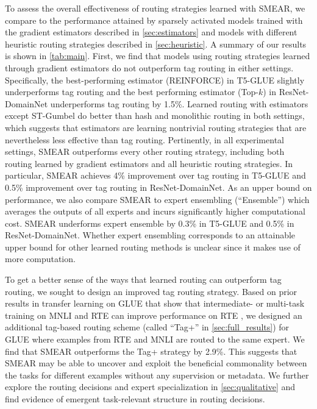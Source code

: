 \documentclass{article}
\theoremstyle{plain}
\theoremstyle{definition}
\theoremstyle{remark}
\begin{document}
To assess the overall effectiveness of routing strategies learned with SMEAR, we compare to the performance attained by sparsely activated models trained with the gradient estimators described in \cref{sec:estimators} and models with different heuristic routing strategies described in \cref{sec:heuristic}.
A summary of our results is shown in \cref{tab:main}.
First, we find that models using routing strategies learned through gradient estimators do not outperform tag routing in either settings. 
Specifically, the best-performing estimator (REINFORCE) in T5-GLUE slightly underperforms tag routing and the best performing estimator (Top-$k$) in ResNet-DomainNet underperforms tag routing by 1.5\%.
Learned routing with estimators except ST-Gumbel do better than hash and monolithic routing in both settings, which suggests that estimators are learning nontrivial routing strategies that are nevertheless less effective than tag routing. 
Pertinently, in all experimental settings, SMEAR outperforms every other routing strategy, including both routing learned by gradient estimators and all heuristic routing strategies.
In particular, SMEAR achieves 4\% improvement over tag routing in T5-GLUE and 0.5\% improvement over tag routing in ResNet-DomainNet.
As an upper bound on performance, we also compare SMEAR to expert ensembling (``Ensemble'') which averages the outputs of all experts and incurs significantly higher computational cost. 
SMEAR underforms expert ensemble by 0.3\% in T5-GLUE and 0.5\% in ResNet-DomainNet.
Whether expert ensembling corresponds to an attainable upper bound for other learned routing methods is unclear since it makes use of more computation.

To get a better sense of the ways that learned routing can outperform tag routing, we sought to design an improved tag routing strategy.
Based on prior results in transfer learning on GLUE that show that intermediate- or multi-task training on MNLI and RTE can improve performance on RTE \citep{phang2018sentence, devlin2018bert, pruksachatkun2020intermediate, vu2020exploring}, we designed an additional tag-based routing scheme (called ``Tag+'' in \cref{sec:full_results}) for GLUE where examples from RTE and MNLI are routed to the same expert.
We find that SMEAR outperforms the Tag+ strategy by 2.9\%. 
This suggests that SMEAR may be able to uncover and exploit the beneficial commonality between the tasks for different examples without any supervision or metadata.
We further explore the routing decisions and expert specialization in \cref{sec:qualitative} and find evidence of emergent task-relevant structure in routing decisions.
\end{document}

